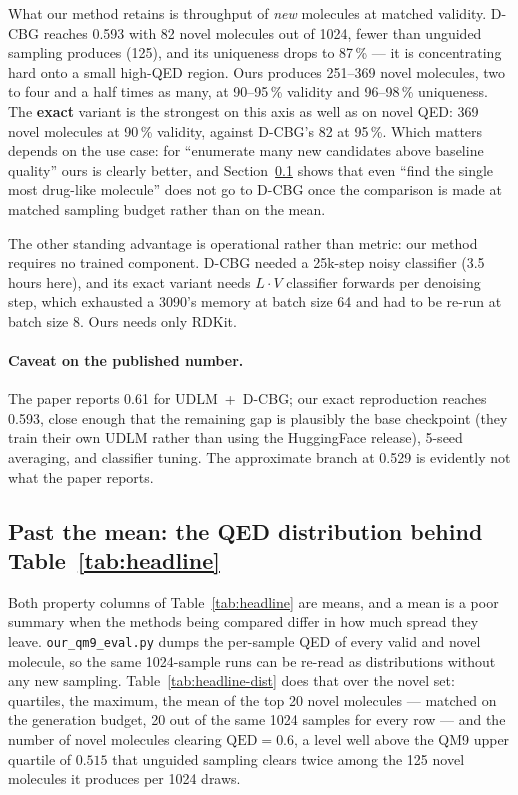 \documentclass[11pt]{article}
\begin{document}
What our method retains is throughput of \emph{new} molecules at matched
validity. D-CBG reaches 0.593 with 82 novel molecules out of 1024, fewer than
unguided sampling produces (125), and its uniqueness drops to 87\,\% --- it is
concentrating hard onto a small high-QED region. Ours produces 251--369 novel
molecules, two to four and a half times as many, at 90--95\,\% validity and
96--98\,\% uniqueness. The \textbf{exact} variant is the strongest on this axis
as well as on novel QED: 369 novel molecules at 90\,\% validity, against D-CBG's
82 at 95\,\%. Which matters depends on the use case: for ``enumerate many new
candidates above baseline quality'' ours is clearly better, and
Section~\ref{sec:dist} shows that even ``find the single most drug-like
molecule'' does not go to D-CBG once the comparison is made at matched sampling
budget rather than on the mean.

The other standing advantage is operational rather than metric: our method
requires no trained component. D-CBG needed a 25k-step noisy classifier
(3.5 hours here), and its exact variant needs $L \cdot V$ classifier forwards
per denoising step, which exhausted a 3090's memory at batch size 64 and had to
be re-run at batch size 8. Ours needs only RDKit.

\paragraph{Caveat on the published number.} The paper reports 0.61 for
UDLM~+~D-CBG; our exact reproduction reaches 0.593, close enough that the
remaining gap is plausibly the base checkpoint (they train their own UDLM rather
than using the HuggingFace release), 5-seed averaging, and classifier tuning.
The approximate branch at 0.529 is evidently not what the paper reports.

\subsection{Past the mean: the QED distribution behind Table~\ref{tab:headline}}
\label{sec:dist}

Both property columns of Table~\ref{tab:headline} are means, and a mean is a poor
summary when the methods being compared differ in how much spread they leave.
\texttt{our\_qm9\_eval.py} dumps the per-sample QED of every valid and novel
molecule, so the same 1024-sample runs can be re-read as distributions without
any new sampling. Table~\ref{tab:headline-dist} does that over the novel set:
quartiles, the maximum, the mean of the top 20 novel molecules --- matched on the
generation budget, 20 out of the same 1024 samples for every row --- and the
number of novel molecules clearing $\mathrm{QED} = 0.6$, a level well above the
QM9 upper quartile of $0.515$ that unguided sampling clears twice among the 125
novel molecules it produces per 1024 draws.
\end{document}
